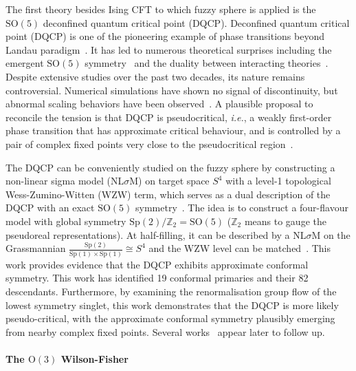 \documentclass{timesjhep}
\begin{document}
The first theory besides Ising CFT to which fuzzy sphere is applied is the $\mathrm{SO}(5)$ deconfined quantum critical point (DQCP). Deconfined quantum critical point (DQCP) is one of the pioneering example of phase transitions beyond Landau paradigm~\cite{Senthil2003DQCP,Senthil2004DQCP,Senthil2023DQCP}. It has led to numerous theoretical surprises including the emergent $\mathrm{SO}(5)$ symmetry~\cite{Nahum2015DQCP} and the duality between interacting theories~\cite{Wang2017DQCP}. Despite extensive studies over the past two decades, its nature remains controversial. Numerical simulations have shown no signal of discontinuity, but abnormal scaling behaviors have been observed~\cite{Senthil2023DQCP}. A plausible proposal to reconcile the tension is that DQCP is pseudocritical, \textit{i.e.}, a weakly first-order phase transition that has approximate critical behaviour, and is controlled by a pair of complex fixed points very close to the pseudocritical region~\cite{Wang2017DQCP,Gorbenko2018Complex}. 

The DQCP can be conveniently studied on the fuzzy sphere by constructing a non-linear sigma model (NL$\sigma$M) on target space $S^4$ with a level-1 topological Wess-Zumino-Witten (WZW) term, which serves as a dual description of the DQCP with an exact $\mathrm{SO}(5)$ symmetry~\cite{Nahum2015DQCP,Wang2017DQCP}. The idea is to construct a four-flavour model with global symmetry $\mathrm{Sp}(2)/\mathbb{Z}_2=\mathrm{SO}(5)$ ($\mathbb{Z}_2$ means to gauge the pseudoreal representations). At half-filling, it can be described by a NL$\sigma$M on the Grassmannian $\tfrac{\mathrm{Sp}(2)}{\mathrm{Sp}(1)\times\mathrm{Sp}(1)}\cong S^4$ and the WZW level can be matched~\cite{Ippoliti2018DQCP,Wang2020DQCP}. This work provides evidence that the DQCP exhibits approximate conformal symmetry. This work has identified 19 conformal primaries and their 82 descendants. Furthermore, by examining the renormalisation group flow of the lowest symmetry singlet, this work demonstrates that the DQCP is more likely pseudo-critical, with the approximate conformal symmetry plausibly emerging from nearby complex fixed points. Several works~\cite{Chen2023WZW,Chen2024WZW} appear later to follow up.

\paragraph{The $\mathrm{O}(3)$ Wilson-Fisher~\cite{Han2023Dec}}
\end{document}
